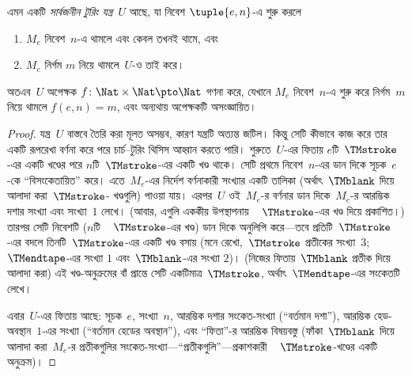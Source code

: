 \documentclass[../../../include/open-logic-section]{subfiles}
\begin{document}
\begin{thm} এমন একটি \emph{সার্বজনীন টুরিং
  যন্ত্র}~$U$ আছে, যা নিবেশ $\tuple{e,n}$-এ শুরু করলে
  \begin{enumerate}
    \item $M_e$ নিবেশ~$n$-এ থামলে এবং কেবল তখনই থামে, এবং
    \item $M_e$ নির্গম $m$ নিয়ে থামলে~$U$-ও তাই করে।
  \end{enumerate}
  অতএব~$U$ অপেক্ষক $f\colon \Nat \times \Nat \pto \Nat$ গণনা করে, যেখানে
  $M_e$ নিবেশ~$n$-এ শুরু করে নির্গম~$m$ নিয়ে থামলে $f(e,n) = m$, এবং
  অন্যথায় অপেক্ষকটি অসংজ্ঞায়িত।
\end{thm}

\begin{proof}
  যন্ত্র~$U$ বাস্তবে তৈরি করা মূলত অসম্ভব, কারণ যন্ত্রটি অত্যন্ত জটিল।
  কিন্তু সেটি কীভাবে কাজ করে তার একটি রূপরেখা বর্ণনা করে পরে চার্চ--টুরিং
  থিসিস আহ্বান করতে পারি। শুরুতে~$U$-এর ফিতায় $e$টি~$\TMstroke$-এর একটি
  খণ্ডের পরে $n$টি~$\TMstroke$-এর একটি খণ্ড থাকে। সেটি প্রথমে নিবেশ~$n$-এর
  ডান দিকে সূচক~$e$-কে “বিসংকেতায়িত” করে। এতে~$M_e$-এর নির্দেশ বর্ণনাকারী
  সংখ্যার একটি তালিকা (অর্থাৎ~$\TMblank$ দিয়ে আলাদা করা~$\TMstroke$-
  খণ্ডগুলি) পাওয়া যায়। এরপর~$U$ ওই~$M_e$-র বর্ণনার ডান দিকে~$M_e$-র
  আরম্ভিক দশার সংখ্যা এবং সংখ্যা~$1$ লেখে। (আবার, এগুলি এককীয় উপস্থাপনায়
  ~ $\TMstroke$-এর খণ্ড দিয়ে প্রকাশিত।) তারপর সেটি নিবেশটি ($n$টি
  ~ $\TMstroke$-এর খণ্ড) ডান দিকে অনুলিপি করে—তবে প্রতিটি~$\TMstroke$-এর
  বদলে তিনটি~$\TMstroke$-এর একটি খণ্ড বসায় (মনে রেখো,~$\TMstroke$
  প্রতীকের সংখ্যা~$3$; $\TMendtape$-এর সংখ্যা $1$ এবং~$\TMblank$-এর সংখ্যা
  $2$)। (নিজের ফিতায়~$\TMblank$ প্রতীক দিয়ে আলাদা করা) এই খণ্ড-অনুক্রমের
  বাঁ প্রান্তে সেটি একটিমাত্র~$\TMstroke$, অর্থাৎ~$\TMendtape$-এর সংকেতটি
  লেখে।

  এবার~$U$-এর ফিতায় আছে: সূচক~$e$, সংখ্যা~$n$, আরম্ভিক দশার সংকেত-সংখ্যা
  (“বর্তমান দশা”), আরম্ভিক হেড-অবস্থান~$1$-এর সংখ্যা (“বর্তমান হেডের
  অবস্থান”), এবং “ফিতা”-র আরম্ভিক বিষয়বস্তু (ফাঁকা~$\TMblank$ দিয়ে আলাদা
  করা~$M_e$-র প্রতীকগুলির সংকেত-সংখ্যা—“প্রতীকগুলি”—প্রকাশকারী
  ~ $\TMstroke$-খণ্ডের একটি অনুক্রম)।


\end{proof}
\end{document}
